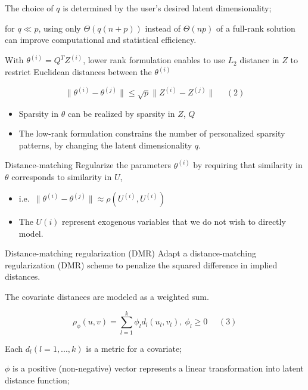 \documentclass[
  10pt,
  ignorenonframetext,
]{beamer}
\begin{document}
\begin{frame}{}
\protect\hypertarget{section}{}
The choice of \(q\) is determined by the user's desired latent
dimensionality;

for \(q \ll p\), using only \(\Theta (q(n+p))\) instead of
\(\Theta(np)\) of a full-rank solution can improve computational and
statistical efficiency.

With \(\theta^{(i)} = Q^T Z^{(i)}\), lower rank formulation enables to
use \(L_2\) distance in \(Z\) to restrict Euclidean distances between
the \(\theta^{(i)}\)

\[
\|\theta^{(i)} - \theta^{(j)} \| \leq \sqrt p \|Z^{(i)} - Z^{(j)}\| \ \ \ \ \ \ (2)
\]

\begin{itemize}
\item
  Sparsity in \(\theta\) can be realized by sparsity in \(Z\), \(Q\)
\item
  The low-rank formulation constrains the number of personalized
  sparsity patterns, by changing the latent dimensionality \(q\).
\end{itemize}
\end{frame}

\begin{frame}{Distance-matching}
\protect\hypertarget{distance-matching}{}
Regularize the parameters \(\theta^{(i)}\) by requiring that similarity
in \(\theta\) corresponds to similarity in \(U\),

\begin{itemize}
\item
  i.e.~\(\| \theta^{(i)} - \theta ^{(j)} \| \approx \rho (U^{(i)}, U^{(i)})\)
\item
  The \(U(i)\) represent exogenous variables that we do not wish to
  directly model.
\end{itemize}
\end{frame}

\begin{frame}{Distance-matching regularization (DMR)}
\protect\hypertarget{distance-matching-regularization-dmr}{}
Adapt a distance-matching regularization (DMR) scheme to penalize the
squared difference in implied distances.

The covariate distances are modeled as a weighted sum.

\[
\rho_{\phi} (u, v) = \sum^k_{l = 1} \phi_l d_l(u_l, v_l), \ \phi_l\geq 0  \ \ \ \ \ \ (3)
\]

\tiny

Each \(d_l (l = 1, ... , k)\) is a metric for a covariate;

\(\phi\) is a positive (non-negative) vector represents a linear
transformation into latent distance function;
\end{frame}
\end{document}
